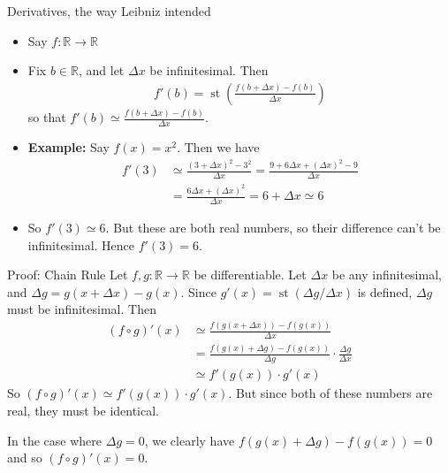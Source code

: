 \documentclass{beamer}
\theoremstyle{plain}
\theoremstyle{definition}
\newcommand{\stp}[1]{\st\left(#1\right)}
\newcommand{\reals}{\mathbb{R}}
\DeclareMathOperator{\st}{st}
\begin{document}
\begin{frame}{Derivatives, the way Leibniz intended}
\begin{itemize}
	\item Say $f: \reals \to \reals$
	\item Fix $b \in \reals$, and let $\Delta x$ be infinitesimal. Then 
	\begin{align*}
	f'(b) = \stp{\frac{f(b + \Delta x) - f(b)}{\Delta x}}
	\end{align*}
	so that $f'(b) \simeq \frac{f(b + \Delta x) - f(b)}{\Delta x}$.
	\item \textbf{Example:} Say $f(x) = x^2$. Then we have 
	\begin{align*}
	f'(3) &\simeq \frac{(3 + \Delta x)^2 - 3^2}{\Delta x} = \frac{9 + 6 \Delta x + (\Delta x)^2 - 9}{\Delta x} \\
		&= \frac{6 \Delta x + (\Delta x)^2}{\Delta x} = 6 + \Delta x \simeq 6
	\end{align*}
	\item So $f'(3) \simeq 6$. But these are both real numbers, so their difference can't be infinitesimal. Hence $f'(3) = 6$.
\end{itemize}
\end{frame}




\begin{frame}{Proof: Chain Rule}
Let $f,g: \reals \to \reals$ be differentiable. Let $\Delta x$ be any infinitesimal, and $\Delta g = g(x + \Delta x) - g(x)$. Since $g'(x) = \st(\Delta g / \Delta x)$ is defined, $\Delta g$ must be infinitesimal. Then
\begin{align*}
(f \circ g)'(x) &\simeq \frac{f(g(x + \Delta x)) - f(g(x))}{\Delta x}  \\
	&= \frac{f(g(x) + \Delta g) - f(g(x))}{\Delta g} \cdot \frac{\Delta g}{\Delta x} \\ 
	&\simeq f'(g(x))\cdot g'(x)
\end{align*}
So $(f \circ g)'(x) \simeq f'(g(x)) \cdot g'(x)$. But since both of these numbers are real, they must be identical. \newline

In the case where $\Delta g = 0$, we clearly have $f(g(x) + \Delta g) - f(g(x)) = 0$ and so $(f \circ g)'(x) = 0$.
\end{frame}
\end{document}
